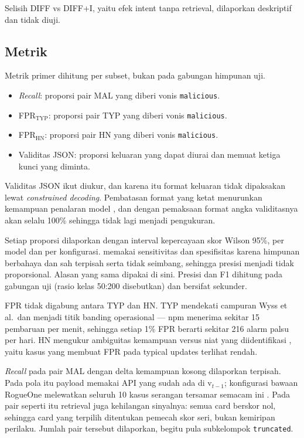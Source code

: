 \documentclass[a4paper,fleqn]{cas-dc}
\begin{document}
Selisih DIFF vs DIFF+I, yaitu efek intent tanpa retrieval, dilaporkan
deskriptif dan tidak diuji.

\subsection{Metrik}\label{sec:metrics}

Metrik primer dihitung per subset, bukan pada gabungan himpunan uji.

\begin{itemize}
\item \emph{Recall}: proporsi pair MAL yang diberi vonis \texttt{malicious}.
\item FPR$_{\mathrm{TYP}}$: proporsi pair TYP yang diberi vonis \texttt{malicious}.
\item FPR$_{\mathrm{HN}}$: proporsi pair HN yang diberi vonis \texttt{malicious}.
\item Validitas JSON: proporsi keluaran yang dapat diurai dan memuat ketiga
kunci yang diminta.
\end{itemize}

Validitas JSON ikut diukur, dan karena itu format keluaran tidak dipaksakan
lewat \emph{constrained decoding}. Pembatasan format yang ketat menurunkan
kemampuan penalaran model \citep{tam2024speak}, dan dengan pemaksaan format
angka validitasnya akan selalu 100\% sehingga tidak lagi menjadi pengukuran.

Setiap proporsi dilaporkan dengan interval kepercayaan skor Wilson 95\%, per
model dan per konfigurasi. \citet{wyss2025evaluating} memakai sensitivitas dan
spesifisitas karena himpunan berbahaya dan sah terpisah serta tidak seimbang,
sehingga presisi menjadi tidak proporsional. Alasan yang sama dipakai di sini.
Presisi dan F1 dihitung pada gabungan uji (rasio kelas 50:200 disebutkan) dan
bersifat sekunder.

FPR tidak digabung antara TYP dan HN. TYP mendekati campuran Wyss et al.\ dan
menjadi titik banding operasional --- npm menerima sekitar 15 pembaruan per
menit, sehingga setiap 1\% FPR berarti sekitar 216 alarm palsu per hari.
HN mengukur ambiguitas kemampuan versus niat yang diidentifikasi
\citet{guo2026effective}, yaitu kasus yang membuat FPR pada typical updates
terlihat rendah.

\emph{Recall} pada pair MAL dengan delta kemampuan kosong dilaporkan terpisah.
Pada pola itu payload memakai API yang sudah ada di $\mathrm{v}_{t-1}$;
konfigurasi bawaan RogueOne melewatkan seluruh 10 kasus serangan tersamar
semacam ini \citep{sofaer2024rogueone}. Pada pair seperti itu retrieval juga
kehilangan sinyalnya: semua card berskor nol, sehingga card yang terpilih
ditentukan pemecah skor seri, bukan kemiripan perilaku. Jumlah pair tersebut
dilaporkan, begitu pula subkelompok \texttt{truncated}.
\end{document}
